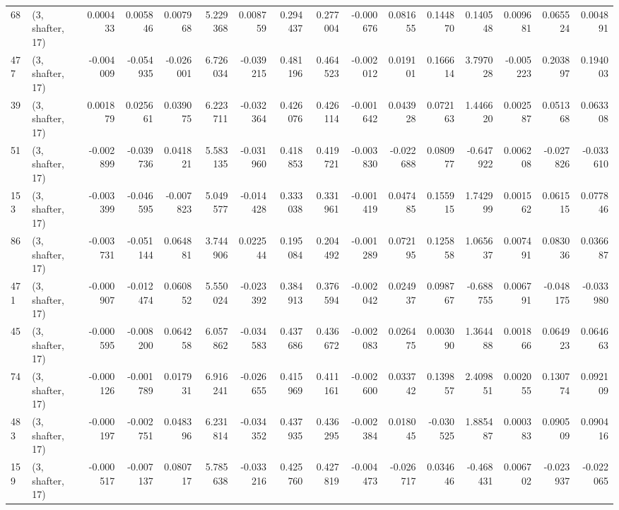 \begin{tabular}{llrrrrrrrrrrrrrr}
68  &  (3, shafter, 17) &   0.000433 &  0.005846 &  0.007968 &   5.229368 &  0.008759 &   0.294437 &  0.277004 & -0.000676 &  0.081655 &  0.144870 &     0.140548 &   0.009681 &   0.065524 &   0.004891 \\
477 &  (3, shafter, 17) &  -0.004009 & -0.054935 & -0.026001 &   6.726034 & -0.039215 &   0.481196 &  0.464523 & -0.002012 &  0.019101 &  0.166614 &     3.797028 &  -0.005223 &   0.203897 &   0.194003 \\
39  &  (3, shafter, 17) &   0.001879 &  0.025661 &  0.039075 &   6.223711 & -0.032364 &   0.426076 &  0.426114 & -0.001642 &  0.043928 &  0.072163 &     1.446620 &   0.002587 &   0.051368 &   0.063308 \\
51  &  (3, shafter, 17) &  -0.002899 & -0.039736 &  0.041821 &   5.583135 & -0.031960 &   0.418853 &  0.419721 & -0.003830 & -0.022688 &  0.080977 &    -0.647922 &   0.006208 &  -0.027826 &  -0.033610 \\
153 &  (3, shafter, 17) &  -0.003399 & -0.046595 & -0.007823 &   5.049577 & -0.014428 &   0.333038 &  0.331961 & -0.001419 &  0.047485 &  0.155915 &     1.742999 &   0.001562 &   0.061515 &   0.077846 \\
86  &  (3, shafter, 17) &  -0.003731 & -0.051144 &  0.064881 &   3.744906 &  0.022544 &   0.195084 &  0.204492 & -0.001289 &  0.072195 &  0.125858 &     1.065637 &   0.007491 &   0.083036 &   0.036687 \\
471 &  (3, shafter, 17) &  -0.000907 & -0.012474 &  0.060852 &   5.550024 & -0.023392 &   0.384913 &  0.376594 & -0.002042 &  0.024937 &  0.098767 &    -0.688755 &   0.006791 &  -0.048175 &  -0.033980 \\
45  &  (3, shafter, 17) &  -0.000595 & -0.008200 &  0.064258 &   6.057862 & -0.034583 &   0.437686 &  0.436672 & -0.002083 &  0.026475 &  0.003090 &     1.364488 &   0.001866 &   0.064923 &   0.064663 \\
74  &  (3, shafter, 17) &  -0.000126 & -0.001789 &  0.017931 &   6.916241 & -0.026655 &   0.415969 &  0.411161 & -0.002600 &  0.033742 &  0.139857 &     2.409851 &   0.002055 &   0.130774 &   0.092109 \\
483 &  (3, shafter, 17) &  -0.000197 & -0.002751 &  0.048396 &   6.231814 & -0.034352 &   0.437935 &  0.436295 & -0.002384 &  0.018045 & -0.030525 &     1.885487 &   0.000383 &   0.090509 &   0.090416 \\
159 &  (3, shafter, 17) &  -0.000517 & -0.007137 &  0.080717 &   5.785638 & -0.033216 &   0.425760 &  0.427819 & -0.004473 & -0.026717 &  0.034646 &    -0.468431 &   0.006702 &  -0.023937 &  -0.022065 \\

\end{tabular}
